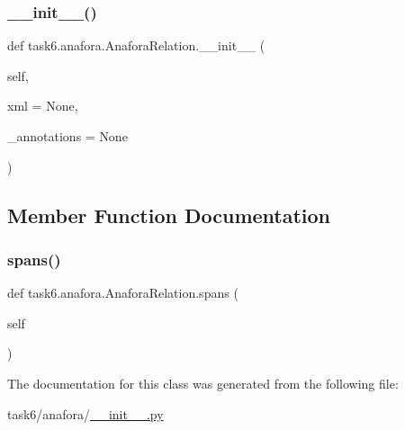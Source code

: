 \subsubsection{\texorpdfstring{\+\_\+\+\_\+init\+\_\+\+\_\+()}{\_\_init\_\_()}}
{\footnotesize\ttfamily def task6.\+anafora.\+Anafora\+Relation.\+\_\+\+\_\+init\+\_\+\+\_\+ (\begin{DoxyParamCaption}\item[{}]{self,  }\item[{}]{xml = {\ttfamily None},  }\item[{}]{\+\_\+annotations = {\ttfamily None} }\end{DoxyParamCaption})}



\subsection{Member Function Documentation}
\mbox{\label{classtask6_1_1anafora_1_1AnaforaRelation_adcc1d717d8601ebf6d0f715bc28f4a12}} 
\subsubsection{\texorpdfstring{spans()}{spans()}}
{\footnotesize\ttfamily def task6.\+anafora.\+Anafora\+Relation.\+spans (\begin{DoxyParamCaption}\item[{}]{self }\end{DoxyParamCaption})}



The documentation for this class was generated from the following file\+:\begin{DoxyCompactItemize}
\item 
task6/anafora/\hyperlink{task6_2anafora_2____init_____8py}{\+\_\+\+\_\+init\+\_\+\+\_\+.\+py}\end{DoxyCompactItemize}
